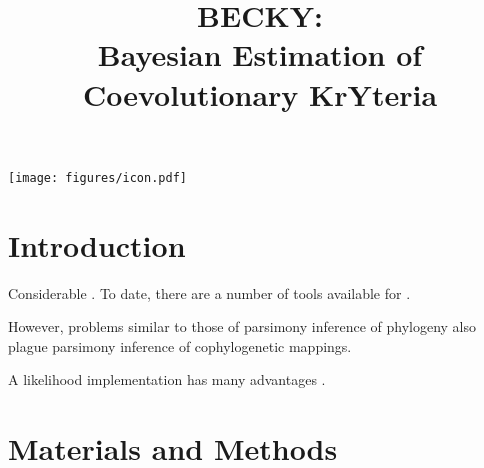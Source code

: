 \documentclass[12pt,letterpaper]{article}
\title{BECKY:\\Bayesian Estimation of Coevolutionary KrYteria}
\begin{document}
\begin{titlepage}
\null
\vfil
\let\newpage\relax\maketitle
\vfil
\centering
\texttt{[image: figures/icon.pdf]}
\vfil
\end{titlepage}

\newpage

\doublespacing

\section*{Introduction}

Considerable . To date, there are a number of tools available for .

However, problems similar to those of parsimony inference of phylogeny also plague parsimony inference of cophylogenetic mappings.

A likelihood implementation has many advantages \cite{Charleston:2009}.

\section*{Materials and Methods}
\end{document}
